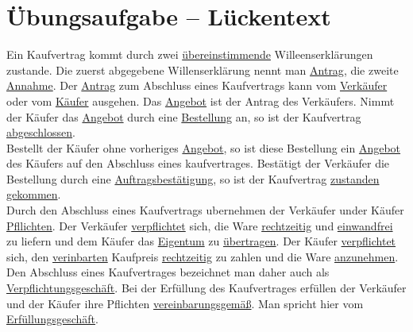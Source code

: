 \documentclass[a4paper,11pt]{scrartcl}	%
\begin{document}
\newpage

\section{Übungsaufgabe --  Lückentext}
Ein Kaufvertrag kommt durch zwei \underline{übereinstimmende} Willeenserklärungen zustande. Die zuerst abgegebene
Willenserklärung nennt man \underline{Antrag}, die zweite \underline{Annahme}. Der \underline{Antrag} zum Abschluss eines
Kaufvertrags kann vom \underline{Verkäufer} oder vom \underline{Käufer} ausgehen. Das \underline{Angebot} ist der 
Antrag des Verkäufers. Nimmt der Käufer das \underline{Angebot} durch eine \underline{Bestellung} an, so ist der Kaufvertrag
\underline{abgeschlossen}.\\[0.5cm]
Bestellt der Käufer ohne vorheriges \underline{Angebot}, so ist diese Bestellung ein \underline{Angebot}
des Käufers auf den Abschluss eines kaufvertrages. Bestätigt der Verkäufer die Bestellung durch eine \underline{Auftragsbestätigung},
so ist der Kaufvertrag \underline{zustanden gekommen}.\\[0.5cm]
Durch den Abschluss eines Kaufvertrags ubernehmen der Verkäufer under Käufer \underline{Pfllichten}. Der Verkäufer
\underline{verpflichtet} sich, die Ware \underline{rechtzeitig} und \underline{einwandfrei} zu liefern und dem Käufer
das \underline{Eigentum} zu \underline{übertragen}. Der Käufer \underline{verpflichtet} sich, den \underline{verinbarten}
Kaufpreis \underline{rechtzeitig} zu zahlen und die Ware \underline{anzunehmen}.\\[0.5cm]
Den Abschluss eines Kaufvertrages bezeichnet man daher auch als \underline{Verpflichtungsgeschäft}.
Bei der Erfüllung des Kaufvertrages erfüllen der Verkäufer und der Käufer ihre Pflichten \underline{vereinbarungsgemäß}.
Man spricht hier vom \underline{Erfüllungsgeschäft}.
\end{document}
